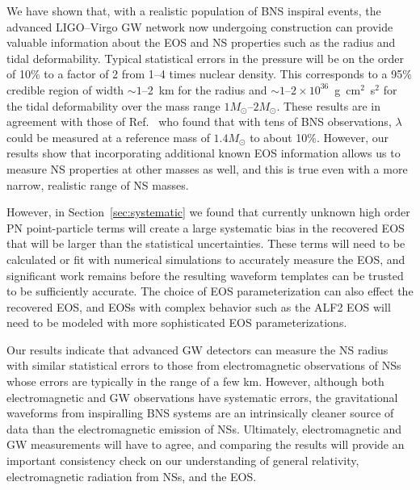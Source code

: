 \documentclass[twocolumn,prd,amssymb,aps,nofootinbib,showpacs,epsf]{revtex4}
\begin{document}
We have shown that, with a realistic population of BNS inspiral events, the advanced LIGO--Virgo GW network now undergoing construction can provide valuable information about the EOS and NS properties such as the radius and tidal deformability. Typical statistical errors in the pressure will be on the order of 10\% to a factor of 2 from 1--4 times nuclear density. This corresponds to a 95\% credible region of width $\sim 1$--2~km for the radius and $\sim 1$--$2\times 10^{36}$~g~cm$^2$~s$^2$ for the tidal deformability over the mass range $1M_\odot$--$2M_\odot$. These results are in agreement with those of Ref.~\cite{DelPozzoLiAgathos2013} who found that with tens of BNS observations, $\lambda$ could be measured at a reference mass of $1.4M_\odot$ to about 10\%. However, our results show that incorporating additional known EOS information allows us to measure NS properties at other masses as well, and this is true even with a more narrow, realistic range of NS masses.

However, in Section~\ref{sec:systematic} we found that currently unknown high order PN point-particle terms will create a large systematic bias in the recovered EOS that will be larger than the statistical uncertainties. These terms will need to be calculated or fit with numerical simulations to accurately measure the EOS, and significant work remains before the resulting waveform templates can be trusted to be sufficiently accurate. The choice of EOS parameterization can also effect the recovered EOS, and EOSs with complex behavior such as the ALF2 EOS will need to be modeled with more sophisticated EOS parameterizations. 


Our results indicate that advanced GW detectors can measure the NS radius with similar statistical errors to those from electromagnetic observations of NSs whose errors are typically in the range of a few km. However, although both electromagnetic and GW observations have systematic errors, the gravitational waveforms from inspiralling BNS systems are an intrinsically cleaner source of data than the electromagnetic emission of NSs. Ultimately, electromagnetic and GW measurements will have to agree, and comparing the results will provide an important consistency check on our understanding of general relativity, electromagnetic radiation from NSs, and the EOS.
 
\end{document}

